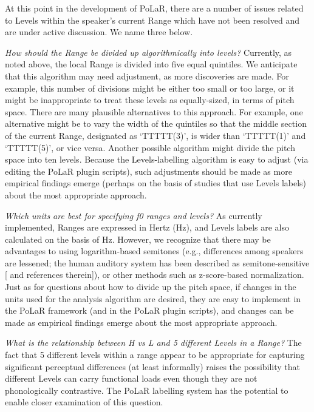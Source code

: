 \documentclass[11pt, twoside]{memoir}
\begin{document}
At this point in the development of PoLaR, there are a number of issues related to Levels within the speaker’s current Range which have not been resolved and are under active discussion.  We name three below.

\textit{How should the Range be divided up algorithmically into levels?} Currently, as noted above, the local Range is divided into five equal quintiles. We anticipate that this algorithm may need adjustment, as more discoveries are made. For example, this number of divisions might be either too small or too large, or it might be inappropriate to treat these levels as equally-sized, in terms of pitch space. There are many plausible alternatives to this approach. For example, one alternative might be to vary the width of the quintiles so that the middle section of the current Range, designated as ‘TTTTT(3)’, is wider than ‘TTTTT(1)’ and ‘TTTTT(5)’, or vice versa. Another possible algorithm might divide the pitch space into ten levels. Because the Levels-labelling algorithm is easy to adjust (via editing the PoLaR plugin scripts), such adjustments should be made as more empirical findings emerge (perhaps on the basis of studies that use Levels labels) about the most appropriate approach.

\textit{Which units are best for specifying f0 ranges and levels?} As currently implemented, Ranges are expressed in Hertz (Hz), and Levels labels are also calculated on the basis of Hz. However, we recognize that there may be advantages to using logarithm-based semitones (e.g., differences among speakers are lessened; the human auditory system has been described as semitone-sensitive [\citealt{nolan03} and references therein]), or other methods such as z-score-based normalization. Just as for questions about how to divide up the pitch space, if changes in the units used for the analysis algorithm are desired, they are easy to implement in the PoLaR framework (and in the PoLaR plugin scripts), and changes can be made as empirical findings emerge about the most appropriate approach.

\textit{What is the relationship between H vs L and 5 different Levels in a Range?}  The fact that 5 different levels within a range appear to be appropriate for capturing significant perceptual differences (at least informally) raises the possibility that different Levels can carry functional loads even though they are not phonologically contrastive.  The PoLaR labelling system has the potential to enable closer examination of this question.
\end{document}
